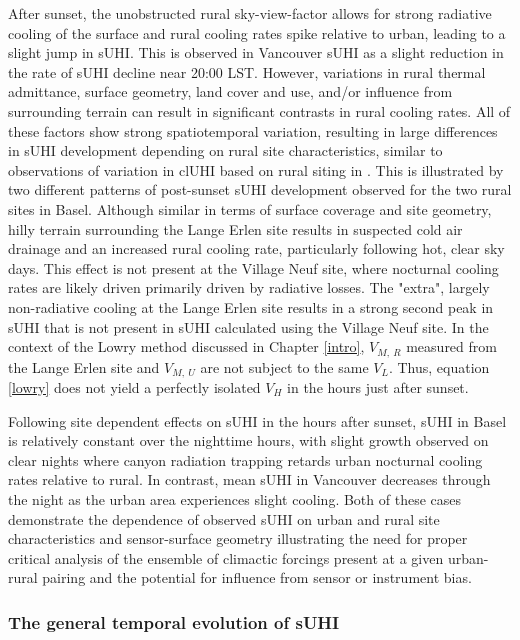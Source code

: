 \begin{bibunit}
After sunset, the unobstructed rural sky-view-factor allows for strong radiative cooling of the surface and rural cooling rates spike relative to urban, leading to a slight jump in sUHI. This is observed in Vancouver sUHI as a slight reduction in the rate of sUHI decline near 20:00 LST. However, variations in rural thermal admittance, surface geometry, land cover and use, and/or influence from surrounding terrain can result in significant contrasts in rural cooling rates. All of these factors show strong spatiotemporal variation, resulting in large differences in sUHI development depending on rural site characteristics, similar to observations of variation in clUHI based on rural siting in \citep{Runnalls2000}. This is illustrated by two different patterns of post-sunset sUHI development observed for the two rural sites in Basel. Although similar in terms of surface coverage and site geometry, hilly terrain surrounding the Lange Erlen site results in suspected cold air drainage and an increased rural cooling rate, particularly following hot, clear sky days. This effect is not present at the Village Neuf site, where nocturnal cooling rates are likely driven primarily driven by radiative losses. The "extra", largely non-radiative cooling at the Lange Erlen site results in a strong second peak in sUHI that is not present in sUHI calculated using the Village Neuf site. In the context of the Lowry method discussed in Chapter \ref{intro}, $V_{M, \ R}$ measured from the Lange Erlen site and $V_{M, \ U}$ are not subject to the same $V_{L}$. Thus, equation \ref{lowry} does not yield a perfectly isolated $V_{H}$ in the hours just after sunset. 

Following site dependent effects on sUHI in the hours after sunset, sUHI in Basel is relatively constant over the nighttime hours, with slight growth observed on clear nights where canyon radiation trapping retards urban nocturnal cooling rates relative to rural. In contrast, mean sUHI in Vancouver decreases through the night as the urban area experiences slight cooling. Both of these cases demonstrate the dependence of observed sUHI on urban and rural site characteristics and sensor-surface geometry illustrating the need for proper critical analysis of the ensemble of climactic forcings present at a given urban-rural pairing and the potential for influence from sensor or instrument bias.

\subsubsection{The general temporal evolution of sUHI}
\label{gen_mod}


\end{bibunit}
